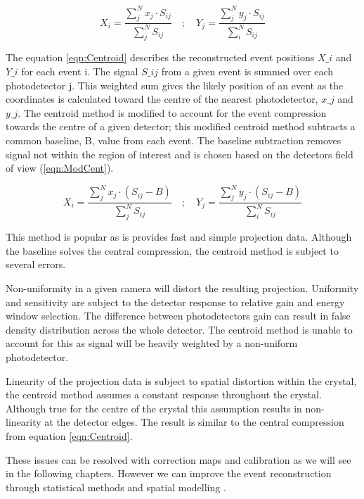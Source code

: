 \begin{equation} \label{eqn:Centroid}
        X_{i} = \frac{\sum^{N}_{j} x_{j} \cdot S_{ij}}{\sum^{N}_{j} S_{ij}} \quad ; \quad  Y_{j} = \frac{\sum^{N}_{j} y_{j} \cdot S_{ij}}{\sum^{N}_{i} S_{ij}}
\end{equation}

The equation \ref{eqn:Centroid} describes the reconstructed event positions $X\_i$ and $Y\_i$ for each event i. The signal $S\_{ij}$ from a given event is summed over each  photodetector j. This weighted sum gives the likely position of an event as the coordinates is calculated toward the centre of the nearest photodetector, $x\_j$ and $y\_j$. The centroid method is modified to account for the event compression towards the centre of a given detector; this modified centroid method subtracts a common baseline, B, value from each event. The baseline subtraction removes signal not within the region of interest and is chosen based on the detectors field of view (\ref{eqn:ModCent}). 

\begin{equation} \label{eqn:ModCent}
        X_{i} = \frac{\sum^{N}_{j} x_{j} \cdot (S_{ij} - B)}{\sum^{N}_{j} S_{ij}} \quad ; \quad  Y_{j} = \frac{\sum^{N}_{j} y_{j} \cdot (S_{ij} - B)}{\sum^{N}_{i} S_{ij}}
\end{equation}

This method is popular as is provides fast and simple projection data. Although the baseline solves the central compression, the centroid method is subject to several errors. 

Non-uniformity in a given camera will distort the resulting projection. Uniformity and sensitivity are subject to the detector response to relative gain and energy window selection. The difference between photodetectors gain can result in false density distribution across the whole detector. The centroid method is unable to account for this as signal will be heavily weighted by a non-uniform photodetector. 

Linearity of the projection data is subject to spatial distortion within the crystal, the centroid method assumes a constant response throughout the crystal. Although true for the centre of the crystal this assumption results in non-linearity at the detector edges. The result is similar to the central compression from equation \ref{eqn:Centroid}.

These issues can be resolved with correction maps and calibration \cite{Miller2012AImagers} \cite{Jin1995CalibrationsMcSPECT-II} as we will see in the following chapters. However we can improve the event reconstruction through statistical methods and spatial modelling \cite{Morozov2015IterativeCamera}. 


